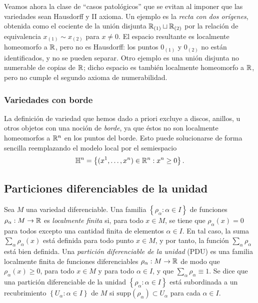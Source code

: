 \documentclass[11pt,a4paper]{amsbook}
\theoremstyle{remark} \newtheorem{rmk}[subsection]{Observación}
\theoremstyle{definition} \newtheorem{defn}[subsection]{Definición}
\theoremstyle{definition} \newtheorem{ex}[subsection]{Ejemplo}
\theoremstyle{definition} \newtheorem{ej}[subsection]{Ejercicio}
\begin{document}
\subsubsection{} Veamos ahora la clase de ``casos patológicos'' que se evitan al imponer que las variedades sean Hausdorff y II axioma. Un ejemplo es la \emph{recta con dos orígenes}, obtenida como el cociente de la unión disjunta $\mathbb R_{(1)} \sqcup \mathbb R_{(2)}$ por la relación de equivalencia $x_{(1)} \sim x_{(2)}$ para $x\neq 0$. El espacio resultante es localmente homeomorfo a $\mathbb R$, pero no es Hausdorff: los puntos $0_{(1)}$ y $0_{(2)}$ no están identificados, y no se pueden separar. Otro ejemplo es una unión disjunta no numerable de copias de $\mathbb R$; dicho espacio es también localmente homeomorfo a $\mathbb R$, pero no cumple el segundo axioma de numerabilidad.

\subsubsection{Variedades con borde} La definición de variedad que hemos dado a priori excluye a discos, anillos, u otros objetos con una noción de \emph{borde}, ya que éstos no son localmente homeomorfos a $\mathbb R^n$ en los puntos del borde. Esto puede solucionarse de forma sencilla reemplazando el modelo local por el semiespacio
\begin{equation*}
\mathbb{H}^n = \left\{ (x^1,\dots,x^n)\in \mathbb R^n: x^n \geq 0 \right\}.
\end{equation*}

\subsection{Particiones diferenciables de la unidad} Sea $M$ una variedad diferenciable. Una familia $\left\{ \rho_\alpha:\alpha \in I \right\}$ de funciones $\rho_\alpha:M\rightarrow \mathbb R$ es \emph{localmente finita} si, para todo $x\in M$, se tiene que $\rho_\alpha(x)=0$ para todos excepto una cantidad finita de elementos $\alpha \in I$. En tal caso, la suma $\sum_{\alpha} \rho_\alpha(x)$ está definida para todo punto $x\in M$, y por tanto, la función $\sum_{\alpha} \rho_\alpha$ está bien definida. Una \emph{partición diferenciable de la unidad} (PDU) es una familia localmente finita de funciones diferenciables $\rho_\alpha:M\rightarrow \mathbb R$ de modo que $\rho_\alpha(x)\geq 0$, para todo $x\in M$ y para todo $\alpha\in I$, y que $\sum_{\alpha}\rho_\alpha \equiv 1$. Se dice que una partición diferenciable de la unidad $\left\{ \rho_\alpha: \alpha \in I \right\}$ está subordinada a un recubrimiento $\left\{ U_\alpha: \alpha \in I \right\}$ de $M$ si $\mathrm{supp}(\rho_\alpha) \subset U_\alpha$ para cada $\alpha \in I$.
\end{document}
